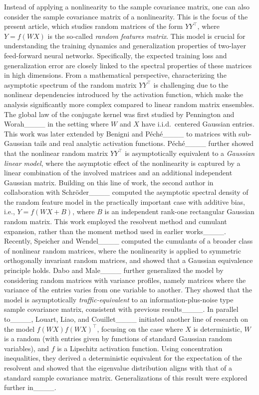Instead of applying a nonlinearity to the sample covariance matrix, one can also consider the sample covariance matrix of a nonlinearity. This is the focus of the present article, which studies random matrices of the form \(YY^\top\), where \(Y = f(WX)\) is the so-called \emph{random features matrix}. This model is crucial for understanding the training dynamics and generalization properties of two-layer feed-forward neural networks. Specifically, the expected training loss and generalization error are closely linked to the spectral properties of these matrices in high dimensions. From a mathematical perspective, characterizing the asymptotic spectrum of the random matrix \(YY^\top\) is challenging due to the nonlinear dependencies introduced by the activation function, which make the analysis significantly more complex compared to linear random matrix ensembles. The global law of the conjugate kernel was first studied by Pennington and Worah____ in the setting where \(W\) and \(X\) have i.i.d.\ centered Gaussian entries. This work was later extended by Benigni and P\'{e}ch\'{e}____ to matrices with sub-Gaussian tails and real analytic activation functions. P\'{e}ch\'{e}____ further showed that the nonlinear random matrix \(YY^\top\) is asymptotically equivalent to a \emph{Gaussian linear model}, where the asymptotic effect of the nonlinearity is captured by a linear combination of the involved matrices and an additional independent Gaussian matrix. Building on this line of work, the second author in collaboration with Schr\"{o}der____ computed the asymptotic spectral density of the random feature model in the practically important case with additive bias, i.e., \(Y = f(WX+B)\), where \(B\) is an independent rank-one rectangular Gaussian random matrix. This work employed the resolvent method and cumulant expansion, rather than the moment method used in earlier works____. Recently, Speicher and Wendel____ computed the cumulants of a broader class of nonlinear random matrices, where the nonlinearity is applied to symmetric orthogonally invariant random matrices, and showed that a Gaussian equivalence principle holds. Dabo and Male____ further generalized the model by considering random matrices with variance profiles, namely matrices where the variance of the entries varies from one variable to another. They showed that the model is asymptotically \emph{traffic-equivalent} to an information-plus-noise type sample covariance matrix, consistent with previous results____. In parallel to____, Louart, Liao, and Couillet____ initiated another line of research on the model \(f(WX) f(WX)^\top\), focusing on the case where \(X\) is deterministic, \(W\) is a random (with entries given by functions of standard Gaussian random variables), and \(f \) is a Lipschitz activation function. Using concentration inequalities, they derived a deterministic equivalent for the expectation of the resolvent and showed that the eigenvalue distribution aligns with that of a standard sample covariance matrix. Generalizations of this result were explored further in____.

